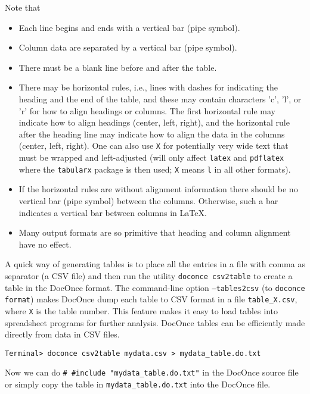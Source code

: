 \documentclass[%
oneside,                 %
final,                   %
10pt]{article}
\newcounter{doconce:movie:counter}
\begin{document}
Note that
\begin{itemize}
 \item Each line begins and ends with a vertical bar (pipe symbol).
 \item Column data are separated by a vertical bar (pipe symbol).
 \item There must be a blank line before and after the table.
 \item There may be horizontal rules, i.e., lines with dashes for
   indicating the heading and the end of the table, and these may
   contain characters 'c', 'l', or 'r' for how to align headings or
   columns. The first horizontal rule may indicate how to align
   headings (center, left, right), and the horizontal rule after the
   heading line may indicate how to align the data in the columns
   (center, left, right).
   One can also use \texttt{X} for potentially very wide text that must be
   wrapped and left-adjusted (will only affect \texttt{latex} and \texttt{pdflatex} where the
   \texttt{tabularx} package is then used; \texttt{X} means \texttt{l} in all other formats).
 \item If the horizontal rules are without alignment information there should
   be no vertical bar (pipe symbol) between the columns. Otherwise, such
   a bar indicates a vertical bar between columns in {\LaTeX}.
 \item Many output formats are so primitive that heading and column alignment
   have no effect.
\end{itemize}
\noindent
A quick way of generating tables is to place all the entries in a file
with comma as separator (a CSV file) and then run the utility
\texttt{doconce csv2table} to create a table in the DocOnce format.
The command-line option \texttt{--tables2csv} (to \texttt{doconce format})
makes DocOnce dump each table to CSV format in a file \Verb!table_X.csv!,
where \texttt{X} is the table number. This feature makes it easy to
load tables into spreadsheet programs for further analysis.
DocOnce tables can be efficiently made directly from data in CSV files.
\begin{Verbatim}[numbers=none,fontsize=\fontsize{9pt}{9pt},baselinestretch=0.95,xleftmargin=2mm]
Terminal> doconce csv2table mydata.csv > mydata_table.do.txt

\end{Verbatim}

Now we can do \Verb!# #include "mydata_table.do.txt"! in the DocOnce
source file or simply copy the table in \Verb!mydata_table.do.txt!
into the DocOnce file.
\end{document}
